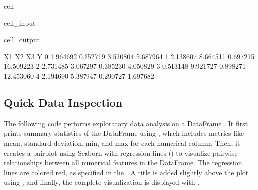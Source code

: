 \documentclass[letterpaper,10pt,english]{jupyterBook}
\begin{document}
\begin{sphinxuseclass}{cell}
\begin{sphinxVerbatimInput}
\begin{sphinxuseclass}{cell_input}
\begin{sphinxVerbatim}[commandchars=\\\{\}]
    
\PYG{p}{[}\PYG{p}{]}    

\end{sphinxVerbatim}

\end{sphinxuseclass}\end{sphinxVerbatimInput}
\begin{sphinxVerbatimOutput}

\begin{sphinxuseclass}{cell_output}
\begin{sphinxVerbatim}[commandchars=\\\{\}]
         X1        X2        X3          Y
0  1.964692  0.852719 \PYGZhy{}3.510804   5.687964
1 \PYGZhy{}2.138607 \PYGZhy{}8.664511 \PYGZhy{}0.697215  16.509223
2 \PYGZhy{}2.731485  3.067297 \PYGZhy{}0.385230  \PYGZhy{}4.050829
3  0.513148  9.921727  0.898271 \PYGZhy{}12.453060
4  2.194690  5.387947 \PYGZhy{}0.290727  \PYGZhy{}1.697682
\end{sphinxVerbatim}

\end{sphinxuseclass}\end{sphinxVerbatimOutput}

\end{sphinxuseclass}

\subsection{Quick Data Inspection}
\label{\detokenize{02:quick-data-inspection}}
\sphinxAtStartPar
The following code performs exploratory data analysis on a DataFrame . It first prints summary statistics of the DataFrame using , which includes metrics like mean, standard deviation, min, and max for each numerical column. Then, it creates a pairplot using Seaborn with regression lines () to visualize pairwise relationships between all numerical features in the DataFrame. The regression lines are colored red, as specified in the . A title is added slightly above the plot using , and finally, the complete visualization is displayed with .
\end{document}
